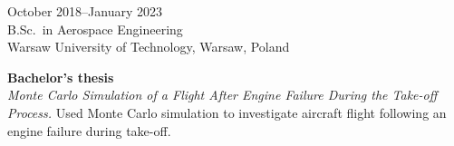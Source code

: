 \bigskip
\noindent
October 2018--January 2023\\
B.Sc.\ in Aerospace Engineering\\
Warsaw University of Technology, Warsaw, Poland

\medskip
\noindent\textbf{Bachelor's thesis}\\
\emph{Monte Carlo Simulation of a Flight After Engine Failure
During the Take-off Process.}
Used Monte Carlo simulation to investigate aircraft flight following
an engine failure during take-off.
\endgroup

